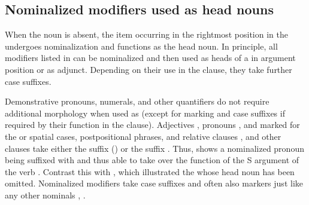 
\subsection{Nominalized modifiers used as head nouns}
\label{ssec:Headless noun phrases and nominalizations}

When the noun is absent, the item occurring in the rightmost position in the  undergoes nominalization and functions as the head noun. In principle, all modifiers listed in  can be nominalized and then used as heads of a  in argument position or as adjunct. Depending on their use in the clause, they take further case suffixes. 
 
Demonstrative pronouns, numerals, and other quantifiers do not require additional morphology when used as  (except for  marking and case suffixes if required by their function in the clause). Adjectives , pronouns , and  marked for the   or spatial cases, postpositional phrases, and relative clauses , and other clauses take either the suffix  () or the suffix . Thus,  shows a nominalized  pronoun being suffixed with  and thus able to take over the function of the S argument of the verb . Contrast this with , which illustrated the  whose head noun has been omitted. Nominalized modifiers take case suffixes and often also  markers just like any other nominals , .

